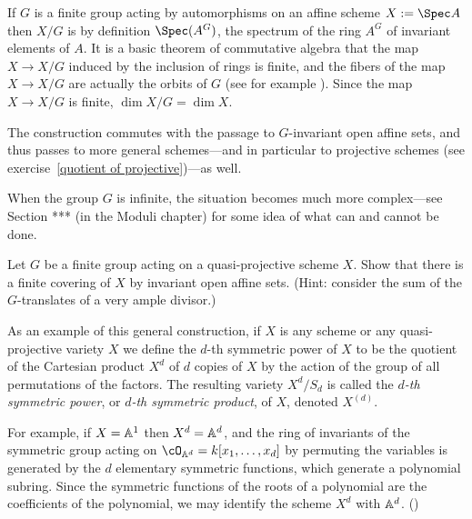 If $G$ is a finite group acting by automorphisms on an affine scheme $X:=\Spec A$ then $X/G$ is by definition $\Spec(A^G)$, the spectrum of the ring $A^G$ of invariant elements of $A$. It is a basic theorem of commutative algebra that the map $X\to X/G$ induced by the inclusion of rings is finite, and the fibers of the map $X\to X/G$ are actually the orbits of $G$ (see for example \cite[Theorem ***]{E}).  Since the map $X\to X/G$ is finite, $\dim X/G = \dim X$. 

The construction commutes with the passage to $G$-invariant open affine sets, and thus passes to more general schemes---and in particular to projective schemes (see exercise~\ref{quotient of projective})---as well.

When the group $G$ is infinite, the situation becomes much more complex---see Section *** (in the Moduli chapter) for some  idea of what can and cannot be done.

\begin{exercise}
 Let $G$ be a finite group acting on a quasi-projective scheme $X$. Show that there is a finite covering of $X$ by invariant open affine sets. (Hint: consider the sum of the $G$-translates of a very ample divisor.)
\end{exercise}

As an example of this general construction, if $X$ is any scheme or any quasi-projective variety $X$ we define the $d$-th symmetric power of $X$ to be the quotient of the Cartesian product $X^d$ of $d$ copies of $X$ by the action of the group of all permutations of the factors. The resulting variety $X^d/S_d$ is called the \emph{$d$-th symmetric power}, or \emph{$d$-th symmetric product}, of $X$, denoted  $X^{(d)}$. 


For example, if $X=\AA^{1}$ then $X^{d} = \AA^{d}$, and the ring of invariants of the symmetric group acting on
$\cO_{\AA^{d}} = k[x_{1}, \dots, x_{d}]$ by permuting the variables is generated by the $d$ elementary symmetric functions, which generate a polynomial subring. Since the symmetric functions of the roots of a polynomial are the coefficients of
the polynomial, we may identify the scheme $X^{d}$ with $\AA^{d}$. (\cite[Exercises 1.6, 13.2-13.4]{E})

